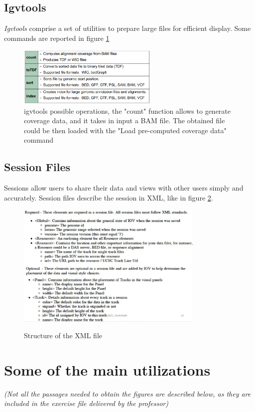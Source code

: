 \subsection{Igvtools}
\textit{Igvtools} comprise a set of utilities to prepare large files for efficient
display. Some commands are reported in figure \ref{fig:commands}

\begin{figure}[H]
    \centering
    \includegraphics[width=0.6\textwidth]{igvtools.PNG}
    \caption{igvtools possible operations, the "count" function allows to generate coverage data, and it takes in input a BAM file. The obtained 
    file could be then loaded with the "Load pre-computed coverage data" command}
    \label{fig:commands}
\end{figure}

\subsection{Session Files}
Sessions allow users to share their data and views with other users simply and accurately. Session files describe the session in XML, like in figure \ref{fig:XMLfile}.

\begin{figure}[H]
    \centering
    \includegraphics[width=0.8\textwidth]{structureXMLfile.PNG}
    \label{fig:XMLfile}
    \caption{Structure of the XML file}
\end{figure} 


\section{Some of the main utilizations}
\textit{(Not all the passages needed to obtain the figures are described below, as they are included in the exercise file delivered by the professor)}

